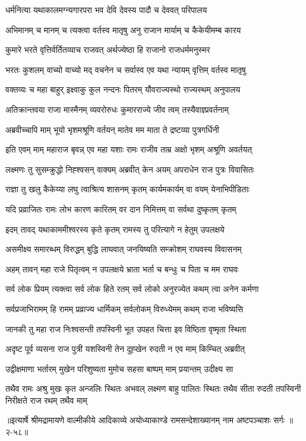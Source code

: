 \twolineshloka
{धर्मनित्या यथाकालमग्न्यगारपरा भव}
{देवि देवस्य पादौ च देववत् परिपालय} %

\twolineshloka
{अभिमानम् च मानम् च त्यक्त्वा वर्तस्व मातृषु}
{अनु राजान मार्याम् च कैकेयीमम्ब कारय} %

\twolineshloka
{कुमारे भरते वृत्तिर्वर्तितव्याच राजवत्}
{अर्थज्येष्ठा हि राजानो राजधर्ममनुस्मर} %

\twolineshloka
{भरतः कुशलम् वाच्यो वाच्यो मद् वचनेन च}
{सर्वास्व एव यथा न्यायम् वृत्तिम् वर्तस्व मातृषु} %

\twolineshloka
{वक्तव्यः च महा बाहुर् इक्ष्वाकु कुल नन्दनः}
{पितरम् यौवराज्यस्थो राज्यस्थम् अनुपालय} %

\twolineshloka
{अतिक्रान्तवया राजा मास्मैनम् व्यवरोरुधः}
{कुमारराज्ये जीव त्वम् तस्यैवाज्ञ्प्रवर्तनाम्} %

\twolineshloka
{अब्रवीच्चापि माम् भूयो भृशमश्रूणि वर्तयन्}
{मातेव मम माता ते द्रष्टव्या पुत्रगर्धिनी} %

\twolineshloka
{इति एवम् माम् महाराज बृवन्न् एव महा यशाः}
{रामः राजीव ताम्र अक्षो भृशम् अश्रूणि अवर्तयत्} %

\twolineshloka
{लक्ष्मणः तु सुसम्क्रुद्धो निह्श्वसन् वाक्यम् अब्रवीत्}
{केन अयम् अपराधेन राज पुत्रः विवासितः} %

\twolineshloka
{राज्ञा तु खलु कैकेय्या लघु त्वाश्रित्य शासनम्}
{कृतम् कार्यमकार्यम् वा वयम् येनाभिपीडिताः} %

\twolineshloka
{यदि प्रव्राजितः रामः लोभ कारण कारितम्}
{वर दान निमित्तम् वा सर्वथा दुष्कृतम् कृतम्} %

\twolineshloka
{इदम् तावद् यथाकाममीश्वरस्य कृते कृतम्}
{रामस्य तु परित्यागे न हेतुम् उपलक्षये} %

\twolineshloka
{असमीक्ष्य समारब्धम् विरुद्धम् बुद्धि लाघवात्}
{जनयिष्यति सम्क्रोशम् राघवस्य विवासनम्} %

\twolineshloka
{अहम् तावन् महा राजे पितृत्वम् न उपलक्षये}
{भ्राता भर्ता च बन्धुः च पिता च मम राघवः} %

\twolineshloka
{सर्व लोक प्रियम् त्यक्त्वा सर्व लोक हिते रतम्}
{सर्व लोको अनुरज्येत कथम् त्वा अनेन कर्मणा} %

\twolineshloka
{सर्वप्रजाभिरामम् हि रामम् प्रव्राज्य धार्मिकम्}
{सर्वलोकम् विरुध्येमम् कथम् राजा भविष्यसि} %

\twolineshloka
{जानकी तु महा राज निःश्वसन्ती तपस्विनी}
{भूत उपहत चित्ता इव विष्ठिता वृष्मृता स्थिता} %

\twolineshloka
{अदृष्ट पूर्व व्यसना राज पुत्री यशस्विनी}
{तेन दुह्खेन रुदती न एव माम् किम्चित् अब्रवीत्} %

\twolineshloka
{उद्वीक्षमाणा भर्तारम् मुखेन परिशुष्यता}
{मुमोच सहसा बाष्पम् माम् प्रयान्तम् उदीक्ष्य सा} %

\fourlineindentedshloka
{तथैव रामः अश्रु मुखः कृत अन्जलिः}
{स्थितः अभवल् लक्ष्मण बाहु पालितः स्थितः}
{तथैव सीता रुदती तपस्विनी}
{निरीक्षते राज रथम् तथैव माम्} %


॥इत्यार्षे श्रीमद्रामायणे वाल्मीकीये आदिकाव्ये अयोध्याकाण्डे रामसन्देशाख्यानम् नाम अष्टपञ्चाशः सर्गः ॥२-५८॥
